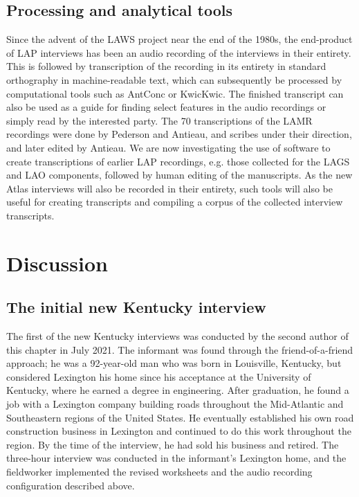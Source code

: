 \documentclass[output=paper]{langscibook}
\begin{document}
\subsection{Processing and analytical tools} %
\label{sec:burkette:3.7}

Since the advent of the LAWS project near the end of the 1980s, the end-product of LAP interviews has been an audio recording of the interviews in their entirety. This is followed by transcription of the recording in its entirety in standard orthography in machine-readable text, which can subsequently be processed by computational tools such as AntConc or KwicKwic. The finished transcript can also be used as a guide for finding select features in the audio recordings or simply read by the interested party. The 70 transcriptions of the LAMR recordings were done by Pederson and Antieau, and scribes under their direction, and later edited by Antieau. We are now investigating the use of software to create transcriptions of earlier LAP recordings, e.g. those collected for the LAGS and LAO components, followed by human editing of the manuscripts. As the new Atlas interviews will also be recorded in their entirety, such tools will also be useful for creating transcripts and compiling a corpus of the collected interview transcripts.

\section{Discussion} %
\label{sec:burkette:4}
\subsection{The initial new Kentucky interview} %
\label{sec:burkette:4.1}
The first of the new Kentucky interviews was conducted by the second author of this chapter in  {July 2021}. The informant was found through the friend-of-a-friend approach; he was a 92-year-old man who was born in Louisville, Kentucky, but considered Lexington his home since his acceptance at the University of Kentucky, where he earned a degree in engineering. After graduation, he found a job with a Lexington company building roads throughout the Mid-Atlantic and Southeastern regions of the United States. He eventually established his own road construction business in Lexington and continued to do this work throughout the region. By the time of the interview, he had sold his business and retired. The three-hour interview was conducted in the informant’s Lexington home, and the fieldworker implemented the revised worksheets and the audio recording configuration described above.
\end{document}
